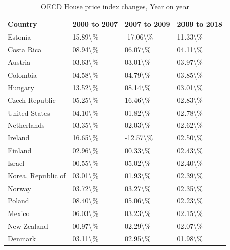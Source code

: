 \documentclass[
]{book}
\begin{document}
\begin{table}

\caption{\label{tab:oecd-house-price-table}OECD House price index changes, Year on year}
\centering
\begin{tabular}[t]{l|l|l|l}
\hline
Country & 2000 to 2007 & 2007 to 2009 & 2009 to 2018\\
\hline
Estonia & 15.89\textbackslash{}\% & -17.06\textbackslash{}\% & 11.33\textbackslash{}\%\\
\hline
Costa Rica & 08.94\textbackslash{}\% & 06.07\textbackslash{}\% & 04.11\textbackslash{}\%\\
\hline
Austria & 03.63\textbackslash{}\% & 03.01\textbackslash{}\% & 03.97\textbackslash{}\%\\
\hline
Colombia & 04.58\textbackslash{}\% & 04.79\textbackslash{}\% & 03.85\textbackslash{}\%\\
\hline
Hungary & 13.52\textbackslash{}\% & 08.14\textbackslash{}\% & 03.01\textbackslash{}\%\\
\hline
Czech Republic & 05.25\textbackslash{}\% & 16.46\textbackslash{}\% & 02.83\textbackslash{}\%\\
\hline
United States & 04.10\textbackslash{}\% & 01.82\textbackslash{}\% & 02.78\textbackslash{}\%\\
\hline
Netherlands & 03.35\textbackslash{}\% & 02.03\textbackslash{}\% & 02.62\textbackslash{}\%\\
\hline
Ireland & 16.65\textbackslash{}\% & -12.57\textbackslash{}\% & 02.50\textbackslash{}\%\\
\hline
Finland & 02.96\textbackslash{}\% & 00.33\textbackslash{}\% & 02.43\textbackslash{}\%\\
\hline
Israel & 00.55\textbackslash{}\% & 05.02\textbackslash{}\% & 02.40\textbackslash{}\%\\
\hline
Korea, Republic of & 03.01\textbackslash{}\% & 01.93\textbackslash{}\% & 02.39\textbackslash{}\%\\
\hline
Norway & 03.72\textbackslash{}\% & 03.27\textbackslash{}\% & 02.35\textbackslash{}\%\\
\hline
Poland & 08.40\textbackslash{}\% & 05.06\textbackslash{}\% & 02.23\textbackslash{}\%\\
\hline
Mexico & 06.03\textbackslash{}\% & 03.23\textbackslash{}\% & 02.15\textbackslash{}\%\\
\hline
New Zealand & 00.97\textbackslash{}\% & 02.29\textbackslash{}\% & 02.07\textbackslash{}\%\\
\hline
Denmark & 03.11\textbackslash{}\% & 02.95\textbackslash{}\% & 01.98\textbackslash{}\%\\

\end{tabular}
\end{table}
\end{document}
